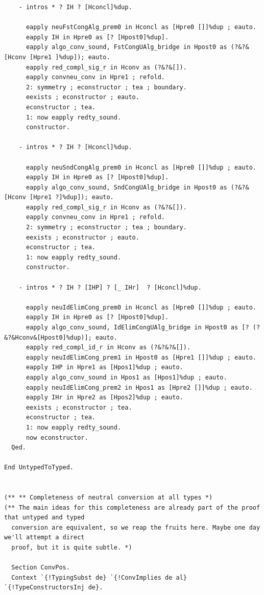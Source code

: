 \begin{lstlisting}
    - intros * ? IH ? [Hconcl]%dup.

      eapply neuFstCongAlg_prem0 in Hconcl as [Hpre0 []]%dup ; eauto.
      eapply IH in Hpre0 as [? [Hpost0]%dup].
      eapply algo_conv_sound, FstCongUAlg_bridge in Hpost0 as (?&?&[Hconv [Hpre1 ]%dup]); eauto.
      eapply red_compl_sig_r in Hconv as (?&?&[]).
      eapply convneu_conv in Hpre1 ; refold.
      2: symmetry ; econstructor ; tea ; boundary.
      eexists ; econstructor ; eauto.
      econstructor ; tea.
      1: now eapply redty_sound.
      constructor.
      
    - intros * ? IH ? [Hconcl]%dup.

      eapply neuSndCongAlg_prem0 in Hconcl as [Hpre0 []]%dup ; eauto.
      eapply IH in Hpre0 as [? [Hpost0]%dup].
      eapply algo_conv_sound, SndCongUAlg_bridge in Hpost0 as (?&?&[Hconv [Hpre1 ?]%dup]); eauto.
      eapply red_compl_sig_r in Hconv as (?&?&[]).
      eapply convneu_conv in Hpre1 ; refold.
      2: symmetry ; econstructor ; tea ; boundary.
      eexists ; econstructor ; eauto.
      econstructor ; tea.
      1: now eapply redty_sound.
      constructor.

    - intros * ? IH ? [IHP] ? [_ IHr]  ? [Hconcl]%dup.

      eapply neuIdElimCong_prem0 in Hconcl as [Hpre0 []]%dup ; eauto.
      eapply IH in Hpre0 as [? [Hpost0]%dup].
      eapply algo_conv_sound, IdElimCongUAlg_bridge in Hpost0 as [? (?&?&Hconv&[Hpost0]%dup)]; eauto.
      eapply red_compl_id_r in Hconv as (?&?&?&[]).
      eapply neuIdElimCong_prem1 in Hpost0 as [Hpre1 []]%dup ; eauto.
      eapply IHP in Hpre1 as [Hpos1]%dup ; eauto.
      eapply algo_conv_sound in Hpos1 as [Hpos1]%dup ; eauto.
      eapply neuIdElimCong_prem2 in Hpos1 as [Hpre2 []]%dup ; eauto.
      eapply IHr in Hpre2 as [Hpos2]%dup ; eauto.
      eexists ; econstructor ; tea.
      econstructor ; tea.
      1: now eapply redty_sound.
      now econstructor.
  Qed.

End UntypedToTyped.


(** ** Completeness of neutral conversion at all types *)
(** The main ideas for this completeness are already part of the proof that untyped and typed
  conversion are equivalent, so we reap the fruits here. Maybe one day we'll attempt a direct
  proof, but it is quite subtle. *)

  Section ConvPos.
  Context `{!TypingSubst de} `{!ConvImplies de al} `{!TypeConstructorsInj de}.


\end{lstlisting}
